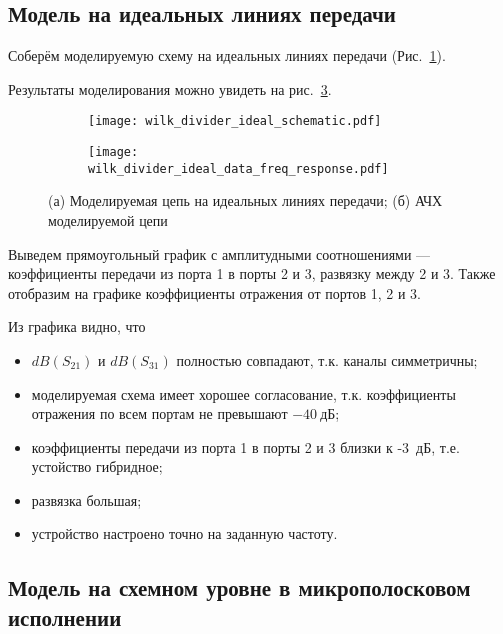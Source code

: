 \subsection{Модель на идеальных линиях передачи}

Соберём моделируемую схему на идеальных линиях передачи (Рис.~\ref{fig:wilk_divider_ideal_schematic}).

Результаты моделирования можно увидеть на рис.~\ref{fig:wilk_divider_ideal_data_1}.

\begin{figure}[!ht]
    \centering
    \begin{subfigure}[b]{0.50\textwidth}
        \centering
        \texttt{[image: wilk\_divider\_ideal\_schematic.pdf]}
        \caption{}%
        \label{fig:wilk_divider_ideal_schematic}
    \end{subfigure}
    \hfill
    \begin{subfigure}[b]{0.40\textwidth}
        \centering
        \texttt{[image: wilk\_divider\_ideal\_data\_freq\_response.pdf]}
        \caption{}%
        \label{fig:wilk_divider_ideal_data_freq_response}
    \end{subfigure}
    \caption{%
        (а) Моделируемая цепь на идеальных линиях передачи;
        (б) АЧХ моделируемой цепи
    }%
    \label{fig:wilk_divider_ideal_data_1}
\end{figure}

Выведем прямоугольный график с амплитудными соотношениями --- коэффициенты передачи из порта 1 в порты 2 и 3, развязку между 2 и 3.
Также отобразим на графике коэффициенты отражения от портов 1, 2 и 3.

Из графика видно, что
\begin{itemize}
    \item $dB(S_{21})$ и $dB(S_{31})$ полностью совпадают, т.к. каналы симметричны;
    \item моделируемая схема имеет хорошее согласование, т.к. коэффициенты отражения по всем портам не превышают $-40~\text{дБ}$;
    \item коэффициенты передачи из порта 1 в порты 2 и 3 близки к -3~дБ, т.е. устойство гибридное;
    \item развязка большая;
    \item устройство настроено точно на заданную частоту.
\end{itemize}

\subsection{Модель на схемном уровне в микрополосковом исполнении}

